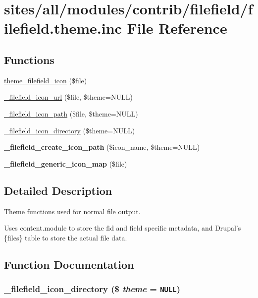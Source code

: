\hypertarget{filefield_8theme_8inc}{
\section{sites/all/modules/contrib/filefield/filefield.theme.inc File Reference}
\label{filefield_8theme_8inc}
}
\subsection*{Functions}
\begin{CompactItemize}
\item 
\hyperlink{filefield_8theme_8inc_6df3b5d0fbba2c291425ea6ebf9212bb}{theme\_\-filefield\_\-icon} (\$file)
\item 
\hyperlink{filefield_8theme_8inc_2920d29854bb1b8d0a5fd56ab9d38dbb}{\_\-filefield\_\-icon\_\-url} (\$file, \$theme=NULL)
\item 
\hyperlink{filefield_8theme_8inc_9774c6058393a3ca64f2acd6e882c4f2}{\_\-filefield\_\-icon\_\-path} (\$file, \$theme=NULL)
\item 
\hyperlink{filefield_8theme_8inc_bed7196babc8d70ce0720a7a97a2327a}{\_\-filefield\_\-icon\_\-directory} (\$theme=NULL)
\item 
\hypertarget{filefield_8theme_8inc_872fdaf64e7f7bab7a23dd55d116067f}{
\textbf{\_\-filefield\_\-create\_\-icon\_\-path} (\$icon\_\-name, \$theme=NULL)}
\label{filefield_8theme_8inc_872fdaf64e7f7bab7a23dd55d116067f}

\item 
\hypertarget{filefield_8theme_8inc_df25ecfa4e108058c5cbe14111d5da8a}{
\textbf{\_\-filefield\_\-generic\_\-icon\_\-map} (\$file)}
\label{filefield_8theme_8inc_df25ecfa4e108058c5cbe14111d5da8a}

\end{CompactItemize}


\subsection{Detailed Description}
Theme functions used for normal file output.

Uses content.module to store the fid and field specific metadata, and Drupal's \{files\} table to store the actual file data. 

\subsection{Function Documentation}
\hypertarget{filefield_8theme_8inc_bed7196babc8d70ce0720a7a97a2327a}{
\subsubsection[{\_\-filefield\_\-icon\_\-directory}]{\setlength{\rightskip}{0pt plus 5cm}\_\-filefield\_\-icon\_\-directory (\$ {\em theme} = {\tt NULL})}}
\label{filefield_8theme_8inc_bed7196babc8d70ce0720a7a97a2327a}


